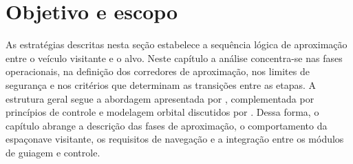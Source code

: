 \section{Objetivo e escopo}
\label{sec:objetivo_escopo}

As estratégias descritas nesta seção estabelece a sequência lógica de aproximação entre o veículo visitante e o alvo.
Neste capítulo a análise concentra-se nas fases operacionais, na definição dos corredores de aproximação, nos limites de segurança e nos critérios que determinam as transições entre as etapas.
A estrutura geral segue a abordagem apresentada por
\cite{fehse2003}, complementada por princípios de controle e modelagem orbital discutidos por \cite{alfriend2010}.
Dessa forma, o capítulo abrange a descrição das fases de aproximação, o comportamento da espaçonave visitante, os requisitos de navegação e a integração entre os módulos de guiagem e controle.